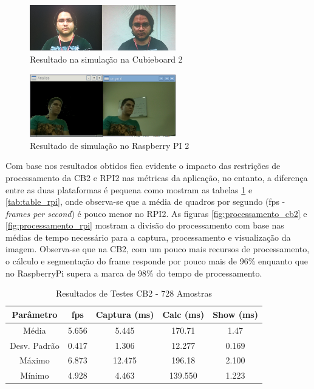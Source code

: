 \documentclass[conference]{IEEEtran}
\begin{document}
\begin{figure}[!t]
\centering
\includegraphics[width=2.5in]{resultado_cb2}
\caption{Resultado na simulação na Cubieboard 2}
\label{fig:sim_pc}
\end{figure}

\begin{figure}[!t]
\centering
\includegraphics[width=2.5in]{Screen_RPI_01}
\caption{Resultado de simulação no Raspberry PI 2}
\label{fig:sim_rpi}
\end{figure}

Com base nos resultados obtidos fica evidente o impacto das restrições de processamento da CB2 e RPI2 nas métricas da aplicação, no entanto, a diferença entre as duas plataformas é pequena como mostram as tabelas \ref{tab:table_cb2} e \ref{tab:table_rpi}, onde observa-se que a média de quadros por segundo (fps - \textit{frames per second}) é pouco menor no RPI2. As figuras \ref{fig:processamento_cb2} e \ref{fig:processamento_rpi} mostram a divisão do processamento com base nas médias de tempo necessário para a captura, processamento e visualização da imagem. Observa-se que na CB2, com um pouco mais recursos de processamento, o cálculo e segmentação do frame responde por pouco mais de 96\% enquanto que no RaspberryPi supera a marca de 98\% do tempo de processamento.


\begin{table}[h]\centering
\renewcommand{\arraystretch}{1.75}
\caption{Resultados de Testes CB2 - 728 Amostras}
\label{tab:table_cb2}
\begin{tabular}{|c|c|c|c|c|}
\hline
\textbf{Parâmetro} & \textbf{fps} & \textbf{Captura (ms)} & \textbf{Calc (ms)} & \textbf{Show (ms)} \\\hline \hline
Média			& 5.656	& 5.445		&	170.71	&	1.47	\\ \hline
Desv. Padrão	& 0.417	& 1.306		&	12.277	&	0.169	\\ \hline
Máximo			& 6.873	& 12.475	&	196.18	&	2.100	\\ \hline
Mínimo			& 4.928	& 4.463		&	139.550	&	1.223	\\ \hline
\end{tabular}
\end{table}
\end{document}
